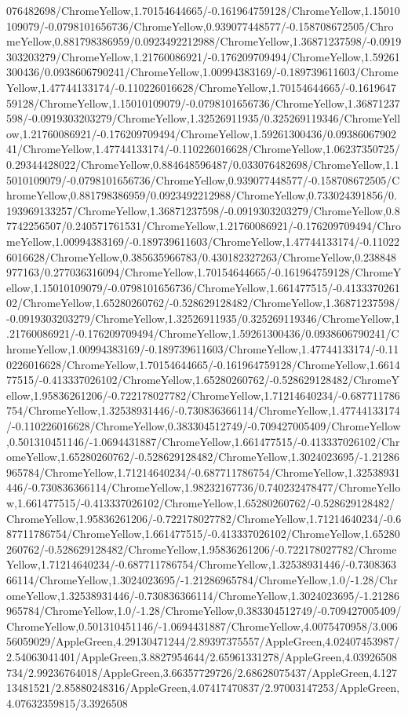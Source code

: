 {\begin{tikzternal}
076482698/ChromeYellow,1.70154644665/-0.161964759128/ChromeYellow,1.15010109079/-0.0798101656736/ChromeYellow,0.939077448577/-0.158708672505/ChromeYellow,0.881798386959/0.0923492212988/ChromeYellow,1.36871237598/-0.0919303203279/ChromeYellow,1.21760086921/-0.176209709494/ChromeYellow,1.59261300436/0.0938606790241/ChromeYellow,1.00994383169/-0.189739611603/ChromeYellow,1.47744133174/-0.110226016628/ChromeYellow,1.70154644665/-0.161964759128/ChromeYellow,1.15010109079/-0.0798101656736/ChromeYellow,1.36871237598/-0.0919303203279/ChromeYellow,1.32526911935/0.325269119346/ChromeYellow,1.21760086921/-0.176209709494/ChromeYellow,1.59261300436/0.0938606790241/ChromeYellow,1.47744133174/-0.110226016628/ChromeYellow,1.06237350725/0.29344428022/ChromeYellow,0.884648596487/0.033076482698/ChromeYellow,1.15010109079/-0.0798101656736/ChromeYellow,0.939077448577/-0.158708672505/ChromeYellow,0.881798386959/0.0923492212988/ChromeYellow,0.733024391856/0.193969133257/ChromeYellow,1.36871237598/-0.0919303203279/ChromeYellow,0.87742256507/0.240571761531/ChromeYellow,1.21760086921/-0.176209709494/ChromeYellow,1.00994383169/-0.189739611603/ChromeYellow,1.47744133174/-0.110226016628/ChromeYellow,0.385635966783/0.430182327263/ChromeYellow,0.238848977163/0.277036316094/ChromeYellow,1.70154644665/-0.161964759128/ChromeYellow,1.15010109079/-0.0798101656736/ChromeYellow,1.661477515/-0.413337026102/ChromeYellow,1.65280260762/-0.528629128482/ChromeYellow,1.36871237598/-0.0919303203279/ChromeYellow,1.32526911935/0.325269119346/ChromeYellow,1.21760086921/-0.176209709494/ChromeYellow,1.59261300436/0.0938606790241/ChromeYellow,1.00994383169/-0.189739611603/ChromeYellow,1.47744133174/-0.110226016628/ChromeYellow,1.70154644665/-0.161964759128/ChromeYellow,1.661477515/-0.413337026102/ChromeYellow,1.65280260762/-0.528629128482/ChromeYellow,1.95836261206/-0.722178027782/ChromeYellow,1.71214640234/-0.687711786754/ChromeYellow,1.32538931446/-0.730836366114/ChromeYellow,1.47744133174/-0.110226016628/ChromeYellow,0.383304512749/-0.709427005409/ChromeYellow,0.501310451146/-1.0694431887/ChromeYellow,1.661477515/-0.413337026102/ChromeYellow,1.65280260762/-0.528629128482/ChromeYellow,1.3024023695/-1.21286965784/ChromeYellow,1.71214640234/-0.687711786754/ChromeYellow,1.32538931446/-0.730836366114/ChromeYellow,1.98232167736/0.740232478477/ChromeYellow,1.661477515/-0.413337026102/ChromeYellow,1.65280260762/-0.528629128482/ChromeYellow,1.95836261206/-0.722178027782/ChromeYellow,1.71214640234/-0.687711786754/ChromeYellow,1.661477515/-0.413337026102/ChromeYellow,1.65280260762/-0.528629128482/ChromeYellow,1.95836261206/-0.722178027782/ChromeYellow,1.71214640234/-0.687711786754/ChromeYellow,1.32538931446/-0.730836366114/ChromeYellow,1.3024023695/-1.21286965784/ChromeYellow,1.0/-1.28/ChromeYellow,1.32538931446/-0.730836366114/ChromeYellow,1.3024023695/-1.21286965784/ChromeYellow,1.0/-1.28/ChromeYellow,0.383304512749/-0.709427005409/ChromeYellow,0.501310451146/-1.0694431887/ChromeYellow,4.0075470958/3.00656059029/AppleGreen,4.29130471244/2.89397375557/AppleGreen,4.02407453987/2.54063041401/AppleGreen,3.8827954644/2.65961331278/AppleGreen,4.03926508734/2.99236764018/AppleGreen,3.66357729726/2.68628075437/AppleGreen,4.12713481521/2.85880248316/AppleGreen,4.07417470837/2.97003147253/AppleGreen,4.07632359815/3.3926508
\end{tikzternal}}
